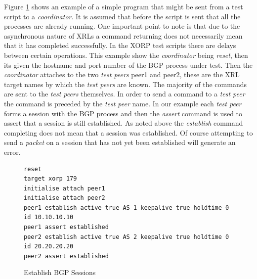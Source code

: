 \documentclass[11pt]{article}
\newcommand{\coordinator}{{\em coordinator}\xspace}
\newcommand{\testpeer}{{\em test peer}\xspace}
\newcommand{\testpeers}{{\em test peers}\xspace}
\begin{document}
Figure \ref{prog:simple} shows an example of a simple program that
might be sent from a test script to a \coordinator. It is assumed that
before the script is sent that all the processes are already running.
One important point to note is that due to the asynchronous nature of
XRLs a command returning does not necessarily mean that it has
completed successfully. In the XORP test scripts there are delays
between certain operations. This example show the \coordinator being
{\em reset}, then its given the hostname and port number of the BGP
process under test. Then the \coordinator attaches to the two
\testpeers peer1 and peer2, these are the XRL target names by which the
\testpeers are known. The majority of the commands are sent to the
\testpeers themselves. In order to send a command to a \testpeer the
command is preceded by the \testpeer name. In our example each
\testpeer forms a session with the BGP process and then the {\em
  assert} command is used to assert that a session is still
established. As noted above the {\em establish} command completing
does not mean that a session was established. Of course attempting to
send a {\em packet} on a session that has not yet been established
will generate an error.

\begin{figure}
\small
\begin{verbatim}
reset
target xorp 179
initialise attach peer1
initialise attach peer2
peer1 establish active true AS 1 keepalive true holdtime 0 id 10.10.10.10
peer1 assert established
peer2 establish active true AS 2 keepalive true holdtime 0 id 20.20.20.20
peer2 assert established
\end{verbatim}
\caption{\label{prog:simple}Establish BGP Sessions}
\end{figure}

\end{document}
